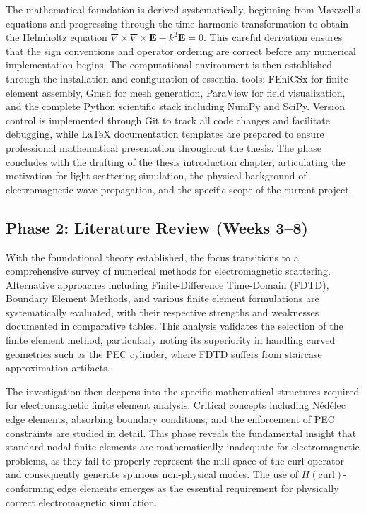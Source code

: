 \documentclass[class=report, crop=false]{standalone}
\begin{document}
The mathematical foundation is derived systematically, beginning from Maxwell's equations and progressing through the time-harmonic transformation to obtain the Helmholtz equation $\nabla \times \nabla \times \bm{E} - k^2 \bm{E} = 0$. This careful derivation ensures that the sign conventions and operator ordering are correct before any numerical implementation begins. The computational environment is then established through the installation and configuration of essential tools: FEniCSx for finite element assembly, Gmsh for mesh generation, ParaView for field visualization, and the complete Python scientific stack including NumPy and SciPy. Version control is implemented through Git to track all code changes and facilitate debugging, while LaTeX documentation templates are prepared to ensure professional mathematical presentation throughout the thesis. The phase concludes with the drafting of the thesis introduction chapter, articulating the motivation for light scattering simulation, the physical background of electromagnetic wave propagation, and the specific scope of the current project.

\subsection{Phase 2: Literature Review (Weeks 3--8)}

With the foundational theory established, the focus transitions to a comprehensive survey of numerical methods for electromagnetic scattering. Alternative approaches including Finite-Difference Time-Domain (FDTD), Boundary Element Methods, and various finite element formulations are systematically evaluated, with their respective strengths and weaknesses documented in comparative tables. This analysis validates the selection of the finite element method, particularly noting its superiority in handling curved geometries such as the PEC cylinder, where FDTD suffers from staircase approximation artifacts.

The investigation then deepens into the specific mathematical structures required for electromagnetic finite element analysis. Critical concepts including Nédélec edge elements, absorbing boundary conditions, and the enforcement of PEC constraints are studied in detail. This phase reveals the fundamental insight that standard nodal finite elements are mathematically inadequate for electromagnetic problems, as they fail to properly represent the null space of the curl operator and consequently generate spurious non-physical modes. The use of $H(\text{curl})$-conforming edge elements emerges as the essential requirement for physically correct electromagnetic simulation.
\end{document}
